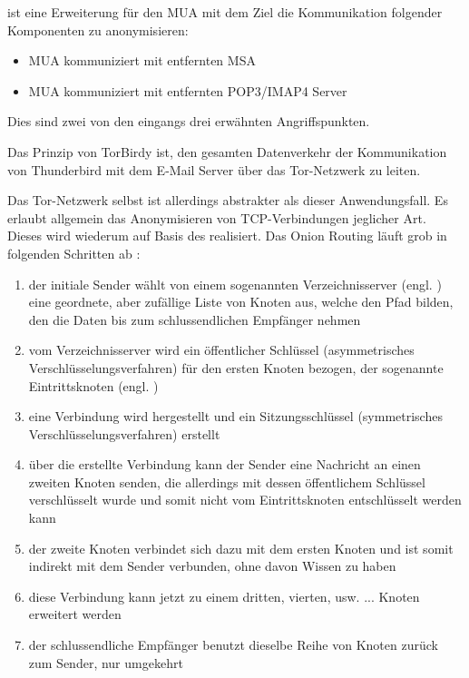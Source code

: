    ist eine Erweiterung für den MUA  mit dem Ziel die Kommunikation folgender Komponenten zu anonymisieren:
\begin{itemize}
\item MUA kommuniziert mit entfernten MSA
\item MUA kommuniziert mit entfernten POP3/IMAP4 Server
\end{itemize}

Dies sind zwei von den eingangs drei erwähnten Angriffspunkten.

Das Prinzip von TorBirdy ist, den gesamten Datenverkehr der Kommunikation von Thunderbird mit dem E-Mail Server über das Tor-Netzwerk  zu leiten.

Das Tor-Netzwerk selbst ist allerdings abstrakter als dieser Anwendungsfall. Es erlaubt allgemein das Anonymisieren von TCP-Verbindungen jeglicher Art. Dieses wird wiederum auf Basis des    realisiert. Das Onion Routing läuft grob in folgenden Schritten ab :
\begin{enumerate}
\item der initiale Sender wählt von einem sogenannten Verzeichnisserver (engl. ) eine geordnete, aber zufällige Liste von Knoten aus, welche den Pfad bilden, den die Daten bis zum schlussendlichen Empfänger nehmen
\item vom Verzeichnisserver wird ein öffentlicher Schlüssel (asymmetrisches Verschlüsselungsverfahren) für den ersten Knoten bezogen, der sogenannte Eintrittsknoten (engl. )
\item eine Verbindung wird hergestellt und ein Sitzungsschlüssel (symmetrisches Verschlüsselungsverfahren) erstellt
\item über die erstellte Verbindung kann der Sender eine Nachricht an einen zweiten Knoten senden, die allerdings mit dessen öffentlichem Schlüssel verschlüsselt wurde und somit nicht vom Eintrittsknoten entschlüsselt werden kann
\item der zweite Knoten verbindet sich dazu mit dem ersten Knoten und ist somit indirekt mit dem Sender verbunden, ohne davon Wissen zu haben
\item diese Verbindung kann jetzt zu einem dritten, vierten, usw. ... Knoten erweitert werden
\item der schlussendliche Empfänger benutzt dieselbe Reihe von Knoten zurück zum Sender, nur umgekehrt
\end{enumerate}

